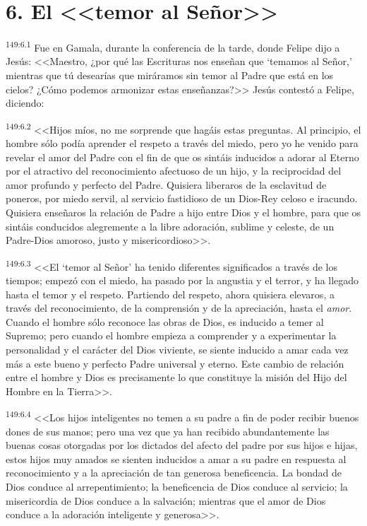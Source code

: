 \section*{6. El <<temor al Señor>>}
\par 
\textsuperscript{149:6.1} Fue en Gamala, durante la conferencia de la tarde, donde Felipe dijo a Jesús: <<Maestro, ¿por qué las Escrituras nos enseñan que `temamos al Señor,' mientras que tú desearías que miráramos sin temor al Padre que está en los cielos? ¿Cómo podemos armonizar estas enseñanzas?>> Jesús contestó a Felipe, diciendo:

\par 
\textsuperscript{149:6.2} <<Hijos míos, no me sorprende que hagáis estas preguntas. Al principio, el hombre sólo podía aprender el respeto a través del miedo, pero yo he venido para revelar el amor del Padre con el fin de que os sintáis inducidos a adorar al Eterno por el atractivo del reconocimiento afectuoso de un hijo, y la reciprocidad del amor profundo y perfecto del Padre. Quisiera liberaros de la esclavitud de poneros, por miedo servil, al servicio fastidioso de un Dios-Rey celoso e iracundo. Quisiera enseñaros la relación de Padre a hijo entre Dios y el hombre, para que os sintáis conducidos alegremente a la libre adoración, sublime y celeste, de un Padre-Dios amoroso, justo y misericordioso>>.

\par 
\textsuperscript{149:6.3} <<El `temor al Señor' ha tenido diferentes significados a través de los tiempos; empezó con el miedo, ha pasado por la angustia y el terror, y ha llegado hasta el temor y el respeto. Partiendo del respeto, ahora quisiera elevaros, a través del reconocimiento, de la comprensión y de la apreciación, hasta el \textit{amor}. Cuando el hombre sólo reconoce las obras de Dios, es inducido a temer al Supremo; pero cuando el hombre empieza a comprender y a experimentar la personalidad y el carácter del Dios viviente, se siente inducido a amar cada vez más a este bueno y perfecto Padre universal y eterno. Este cambio de relación entre el hombre y Dios es precisamente lo que constituye la misión del Hijo del Hombre en la Tierra>>.

\par 
\textsuperscript{149:6.4} <<Los hijos inteligentes no temen a su padre a fin de poder recibir buenos dones de sus manos; pero una vez que ya han recibido abundantemente las buenas cosas otorgadas por los dictados del afecto del padre por sus hijos e hijas, estos hijos muy amados se sienten inducidos a amar a su padre en respuesta al reconocimiento y a la apreciación de tan generosa beneficencia. La bondad de Dios conduce al arrepentimiento; la beneficencia de Dios conduce al servicio; la misericordia de Dios conduce a la salvación; mientras que el amor de Dios conduce a la adoración inteligente y generosa>>.

